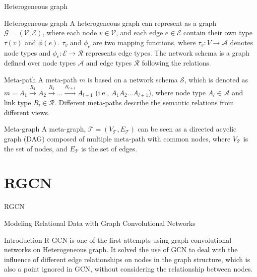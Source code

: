 \documentclass[aspectratio=1610,xcolor={dvipsnames},hyperref={colorlinks,unicode,linkcolor=violet,anchorcolor=blueviolet,citecolor=YellowOrange,filecolor=black,urlcolor=Aquamarine}]{beamer}
\begin{document}
\begin{frame}[label={sec:org60bcfb2}]{Heterogeneous graph}
\begin{block}{Heterogeneous graph}
A heterogeneous graph can represent as a graph \(\mathcal{G} =
(\mathcal{V}, \mathcal{E})\), where each node \(v \in \mathcal{V}\),
and each edge \(e \in \mathcal{E}\) contain their own type \(\tau(v)\)
and \(\phi(e)\).  \(\tau_{v}\) and \(\phi_{e}\) are two mapping
functions, where \(\tau_{v}:V\rightarrow\mathcal{A}\) denotes node
types and \(\phi_{e}:\mathcal{E}\rightarrow\mathcal{R}\) represents
edge types.  The network schema is a graph defined over node types
\(\mathcal{A}\) and edge types \(\mathcal{R}\) following the
relations.
\end{block}

\begin{block}{Meta-path}
A meta-path \(m\) is based on a network schema \(\mathcal{S}\), which is
denoted as \(m = A_1 \overset{R_1}{\rightarrow} A_2 \overset{R_2}{\rightarrow}
... \overset{R_{l+1}}{\rightarrow} A_{l+1}\) (i.e., \(A_1A_2...A_{l+1}\)), where
node type \(A_{l} \in \mathcal{A}\) and link type \(R_{l} \in
\mathcal{R}\).  Different meta-paths describe the semantic relations from
different views.
\end{block}

\begin{block}{Meta-graph}
A meta-graph, \(\mathcal{T} = (V_{\mathcal{T}}, E_{\mathcal{T}})\) can
be seen as a directed acyclic graph (DAG) composed of multiple
meta-path with common nodes, where \(V_{\mathcal{T}}\) is the set of
nodes, and \(E_{\mathcal{T}}\) is the set of edges.
\end{block}
\end{frame}

\section{RGCN}
\label{sec:org9c1a385}

\begin{frame}[label={sec:org56e8329}]{RGCN}
\begin{center}
\Huge Modeling Relational Data with Graph Convolutional Networks
\end{center}

\end{frame}

\begin{frame}[label={sec:org182ed52}]{Introduction}
R-GCN is one of the first attempts using graph convolutional networks
on Heterogeneous graph.  It solved the use of GCN to deal with the
influence of different edge relationships on nodes in the graph
structure, which is also a point ignored in GCN, without considering
the relationship between nodes.
\end{frame}
\end{document}
